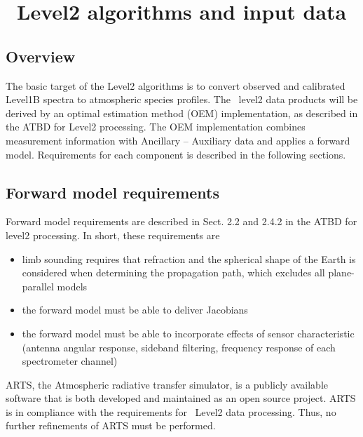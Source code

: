 \chapter{\smr\ Level2 algorithms and input data}
\section{Overview}
The basic target of the Level2 algorithms is to
convert observed and calibrated Level1B spectra
to atmospheric species profiles.
The \smr\ level2 data products will be derived by an
optimal estimation method (OEM) implementation, as described
in the ATBD for Level2 processing. 
The OEM implementation combines measurement information with 
Ancillary -- Auxiliary data and applies a forward 
model. Requirements for each component is described in the
following sections.

\section{Forward model requirements}

Forward model requirements are described in Sect. 2.2
and 2.4.2 in the ATBD for level2 processing.
In short, these requirements are

\begin{itemize}


\item limb sounding requires that refraction and the spherical shape
of the Earth is considered when determining the propagation path,
which excludes all plane-parallel models 

\item the forward model must be able to deliver Jacobians

\item the forward model must be able to incorporate effects of
sensor characteristic (antenna angular response, sideband filtering,
frequency response of each spectrometer channel) 

\end{itemize}

ARTS, the Atmospheric radiative transfer simulator, 
is a publicly available software that is both developed and 
maintained as an open source project.
ARTS is in compliance with the requirements for \smr\ Level2
data processing. Thus, no further refinements of ARTS must be performed.



